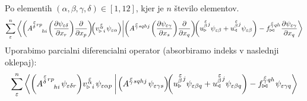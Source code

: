 Po elementih $(\alpha, \beta, \gamma, \delta) \in [1,12]$, kjer je $n$ število elementov.
\begin{equation}
   \sum^n_{\varepsilon}
   \braket{
      \qty(A^{\substack{\mkern2mu \varepsilon \\[0.12mm] \delta} \mkern2mu r p}_{\mkern29mu hi} \mkern2mu    \qty( \pdv{\psi_{ \varepsilon \delta}}{x_r} ) \frac{\partial}{\partial x_p} ) \mkern-4mu
      \qty(v^{\mkern 2mu \substack{\varepsilon \\[-0.7mm] \alpha \\[-0.2mm]}}_{\triangleright \mkern5mu i} \mkern2mu \psi_{\varepsilon \alpha} )}
   {
      \qty(A^{\substack{\mkern2mu \varepsilon \\[-0.59mm] \gamma} \mkern2mu sqhj} \mkern2mu     \qty( \pdv{\psi_{\varepsilon \gamma}}{x_s} ) \frac{\partial}{\partial x_q} ) \mkern-4mu
      \qty(u^{\substack{\mkern2mu \varepsilon \\[0.14mm] \beta} \mkern2mu j}_\triangleright     \psi_{\varepsilon \beta} + u^{\substack{\mkern2mu \varepsilon \\[0.14mm] \beta} \mkern2mu j}_\triangleleft     \psi_{\varepsilon \beta} )
      -
      f^{\substack{\mkern2mu \varepsilon \\[-0.59mm] \gamma} \mkern2mu q h}_{\bowtie} \mkern1mu \pdv{\psi_{\varepsilon \gamma}}{x_q}}
\end{equation}
Uporabimo parcialni diferencialni operator (absorbiramo indeks v naslednji oklepaj):
\begin{equation*}
   \sum^n_\varepsilon
   \braket{
      \qty( A^{\substack{\mkern2mu \varepsilon \\[0.15mm] \delta} \mkern2mu r p}_{\mkern29mu hi} \mkern2mu     \psi_{ \varepsilon \delta r} )
      v^{\mkern 2mu \substack{\varepsilon \\[-0.59mm] \alpha \\[-0.2mm]}}_{\triangleright \mkern5mu i} \mkern2mu \psi_{\varepsilon \alpha p} \mkern4mu}
   {
      \mkern2mu \qty( A^{\substack{\mkern2mu \varepsilon \\[-0.59mm] \gamma} \mkern2mu sqhj} \mkern2mu     \psi_{\varepsilon \gamma s} ) \mkern-4mu 
      \qty( u^{\substack{\mkern2mu \varepsilon \\[0.14mm] \beta} \mkern2mu j}_\triangleright     \psi_{\varepsilon \beta q} + u^{\substack{\mkern2mu \varepsilon \\[0.14mm] \beta} \mkern2mu j}_\triangleleft     \psi_{\varepsilon \beta q} )
      -
      f^{\substack{\mkern2mu \varepsilon \\[-0.59mm] \gamma} \mkern2mu q h}_{\bowtie} \mkern1mu \psi_{\varepsilon \gamma q} }
\end{equation*}
